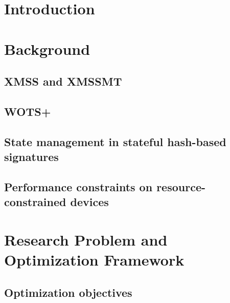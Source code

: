 \documentclass[pdflatex,sn-mathphys-num]{sn-jnl}
\begin{document}
\section{Introduction}
\label{sec:introduction}


\section{Background}
\label{sec:background}

\subsection{XMSS and XMSSMT}

\subsection{WOTS+}

\subsection{State management in stateful hash-based signatures}

\subsection{Performance constraints on resource-constrained devices}

\section{Research Problem and Optimization Framework}
\label{sec:framework}


\subsection{Optimization objectives}
\end{document}
